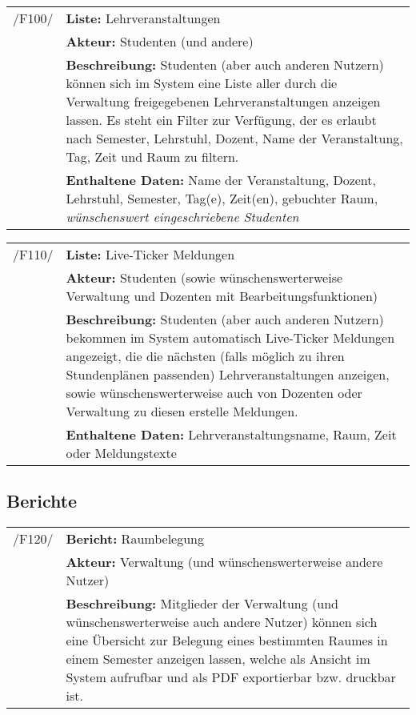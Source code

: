 \begin{tabular}{p{1.5cm}p{14.5cm}}
	
	 /F100/& \textbf{Liste:} Lehrveranstaltungen \\
				& \textbf{Akteur:} Studenten (und andere) \\
				& \textbf{Beschreibung:} Studenten (aber auch anderen Nutzern) können sich im System eine Liste aller durch die Verwaltung freigegebenen Lehrveranstaltungen anzeigen lassen. Es steht ein Filter zur Verfügung, der es erlaubt nach Semester, Lehrstuhl, Dozent, Name der Veranstaltung, Tag, Zeit und Raum zu filtern.\\
				& \textbf{Enthaltene Daten:} Name der Veranstaltung, Dozent, Lehrstuhl, Semester, Tag(e), Zeit(en), gebuchter Raum, \textsl{wünschenswert eingeschriebene Studenten} \\[0.25cm]

\end{tabular}


\begin{tabular}{p{1.5cm}p{14.5cm}}
	
	 /F110/& \textbf{Liste:} Live-Ticker Meldungen \\
				& \textbf{Akteur:} Studenten (sowie wünschenswerterweise Verwaltung und Dozenten mit Bearbeitungsfunktionen) \\
				& \textbf{Beschreibung:} Studenten (aber auch anderen Nutzern) bekommen im System automatisch Live-Ticker Meldungen angezeigt, die die nächsten (falls möglich zu ihren Stundenplänen passenden) Lehrveranstaltungen anzeigen, sowie wünschenswerterweise auch von Dozenten oder Verwaltung zu diesen erstelle Meldungen.\\
				& \textbf{Enthaltene Daten:} Lehrveranstaltungsname, Raum, Zeit oder Meldungstexte \\[0.25cm]

				
\end{tabular}


\subsection{Berichte}


\begin{tabular}{p{1.5cm}p{14.5cm}}


	 /F120/& \textbf{Bericht:} Raumbelegung \\
				& \textbf{Akteur:} Verwaltung (und wünschenswerterweise andere Nutzer) \\
				& \textbf{Beschreibung:} Mitglieder der Verwaltung (und wünschenswerterweise auch andere Nutzer) können sich eine Übersicht zur Belegung eines bestimmten Raumes in einem Semester anzeigen lassen, welche als Ansicht im System aufrufbar und als PDF exportierbar bzw. druckbar ist. \\[0.25cm]

\end{tabular}


